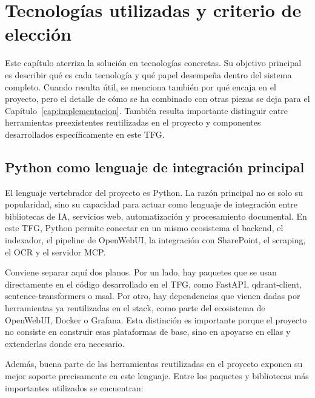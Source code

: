 \chapter{Tecnologías utilizadas y criterio de elección}
\label{cap:tecnologias}

Este capítulo aterriza la solución en tecnologías concretas. Su objetivo principal es describir qué es cada tecnología y qué papel desempeña dentro del sistema completo. Cuando resulta útil, se menciona también por qué encaja en el proyecto, pero el detalle de cómo se ha combinado con otras piezas se deja para el Capítulo~\ref{cap:implementacion}. También resulta importante distinguir entre herramientas preexistentes reutilizadas en el proyecto y componentes desarrollados específicamente en este TFG.

\section{Python como lenguaje de integración principal}
\label{sec:python}

El lenguaje vertebrador del proyecto es Python. La razón principal no es solo su popularidad, sino su capacidad para actuar como lenguaje de integración entre bibliotecas de IA, servicios web, automatización y procesamiento documental. En este TFG, Python permite conectar en un mismo ecosistema el backend, el indexador, el pipeline de OpenWebUI, la integración con SharePoint, el scraping, el OCR y el servidor MCP.

Conviene separar aquí dos planos. Por un lado, hay paquetes que se usan directamente en el código desarrollado en el TFG, como FastAPI, qdrant-client, sentence-transformers o msal. Por otro, hay dependencias que vienen dadas por herramientas ya reutilizadas en el stack, como parte del ecosistema de OpenWebUI, Docker o Grafana. Esta distinción es importante porque el proyecto no consiste en construir esas plataformas de base, sino en apoyarse en ellas y extenderlas donde era necesario.

Además, buena parte de las herramientas reutilizadas en el proyecto exponen su mejor soporte precisamente en este lenguaje. Entre los paquetes y bibliotecas más importantes utilizados se encuentran:

